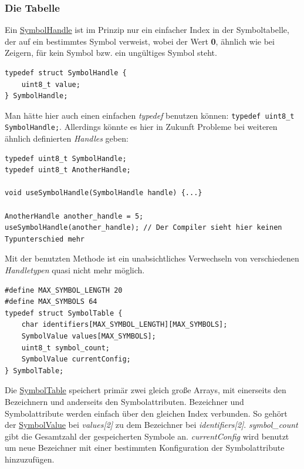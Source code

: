 \documentclass[oneside]{ausarbeitung}
\begin{document}
\subsubsection{Die Tabelle}
\label{subsub:impl_table}
Ein \hyperref[lst:SymbolHandle]{SymbolHandle} ist im Prinzip nur ein einfacher Index in der Symboltabelle, der auf ein bestimmtes Symbol verweist, wobei der Wert \textbf{0}, ähnlich wie bei Zeigern, für kein Symbol bzw. ein ungültiges Symbol steht.
\begin{lstlisting}[label={lst:SymbolHandle}, caption={SymbolHandle}]
typedef struct SymbolHandle {
    uint8_t value;
} SymbolHandle;
\end{lstlisting}
 Man hätte hier auch einen einfachen \textit{typedef} benutzen können: \lstinline[columns=fixed]{typedef uint8_t SymbolHandle;}. Allerdings könnte es hier in Zukunft Probleme bei weiteren ähnlich definierten \textit{Handles} geben:
\begin{lstlisting}[label={lst:about_handles}, caption={Problem beim Definieren von "`Handle"'-typen mit typedef}]
typedef uint8_t SymbolHandle;
typedef uint8_t AnotherHandle;

void useSymbolHandle(SymbolHandle handle) {...}

AnotherHandle another_handle = 5;
useSymbolHandle(another_handle); // Der Compiler sieht hier keinen Typunterschied mehr
\end{lstlisting}
Mit der benutzten Methode ist ein unabsichtliches Verwechseln von verschiedenen \textit{Handletypen} quasi nicht mehr möglich.

\begin{lstlisting}[label={lst:SymbolTable}, caption={SymbolTable}]
#define MAX_SYMBOL_LENGTH 20
#define MAX_SYMBOLS 64
typedef struct SymbolTable {
    char identifiers[MAX_SYMBOL_LENGTH][MAX_SYMBOLS];
    SymbolValue values[MAX_SYMBOLS];
    uint8_t symbol_count;
    SymbolValue currentConfig;
} SymbolTable;
\end{lstlisting}
Die \hyperref[lst:SymbolTable]{SymbolTable} speichert primär zwei gleich große Arrays, mit einerseits den Bezeichnern und anderseits den Symbolattributen. Bezeichner und Symbolattribute werden einfach über den gleichen Index verbunden. So gehört der \hyperref[lst:SymbolValue]{SymbolValue} bei \textit{values[2]} zu dem Bezeichner bei \textit{identifiers[2]}. \textit{symbol\_count} gibt die Gesamtzahl der gespeicherten Symbole an. \textit{currentConfig} wird benutzt um neue Bezeichner mit einer bestimmten Konfiguration der Symbolattribute hinzuzufügen.
\end{document}
